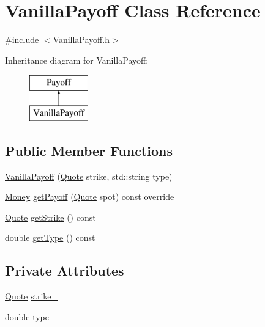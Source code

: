 \hypertarget{class_vanilla_payoff}{}\section{Vanilla\+Payoff Class Reference}
\label{class_vanilla_payoff}


{\ttfamily \#include $<$Vanilla\+Payoff.\+h$>$}

Inheritance diagram for Vanilla\+Payoff\+:\begin{figure}[H]
\begin{center}
\leavevmode
\includegraphics[height=2.000000cm]{class_vanilla_payoff}
\end{center}
\end{figure}
\subsection*{Public Member Functions}
\begin{DoxyCompactItemize}
\item 
\hyperlink{class_vanilla_payoff_ae0d7f1fdb70f4ad9c2002f96df2199d3}{Vanilla\+Payoff} (\hyperlink{_name_def_8h_a642a6c5fd87319d922637de0e0bb0305}{Quote} strike, std\+::string type)
\item 
\hyperlink{_name_def_8h_a5a9d48c16a694e9a2d9f1eca730dc8c5}{Money} \hyperlink{class_vanilla_payoff_aa141f5b29c30d54448c93a21bef83bb3}{get\+Payoff} (\hyperlink{_name_def_8h_a642a6c5fd87319d922637de0e0bb0305}{Quote} spot) const override
\item 
\hyperlink{_name_def_8h_a642a6c5fd87319d922637de0e0bb0305}{Quote} \hyperlink{class_vanilla_payoff_ae99fb31f1496f723ec598367ece825e3}{get\+Strike} () const
\item 
double \hyperlink{class_vanilla_payoff_ac1b4cc9e4152ed3f7c07c71270fc1831}{get\+Type} () const
\end{DoxyCompactItemize}
\subsection*{Private Attributes}
\begin{DoxyCompactItemize}
\item 
\hyperlink{_name_def_8h_a642a6c5fd87319d922637de0e0bb0305}{Quote} \hyperlink{class_vanilla_payoff_a63c2c23fecb9b43cd250e28791a31a56}{strike\+\_\+}
\item 
double \hyperlink{class_vanilla_payoff_a4a09d08187de77df248cc3f7498e3e2f}{type\+\_\+}
\end{DoxyCompactItemize}


